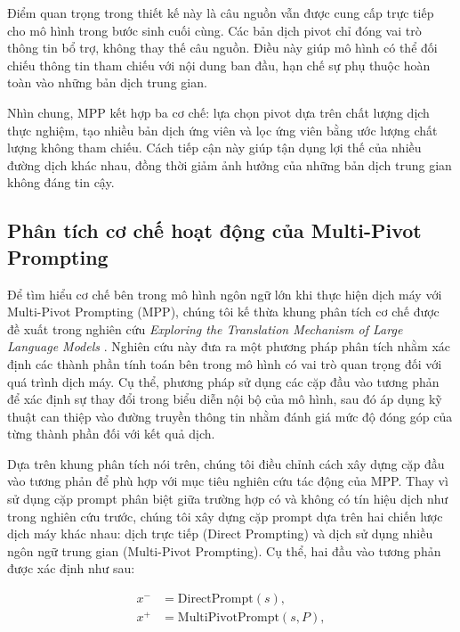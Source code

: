 Điểm quan trọng trong thiết kế này là câu nguồn vẫn được cung cấp trực tiếp cho mô hình trong bước sinh cuối cùng. Các bản dịch pivot chỉ đóng vai trò thông tin bổ trợ, không thay thế câu nguồn. Điều này giúp mô hình có thể đối chiếu thông tin tham chiếu với nội dung ban đầu, hạn chế sự phụ thuộc hoàn toàn vào những bản dịch trung gian.

Nhìn chung, MPP kết hợp ba cơ chế: lựa chọn pivot dựa trên chất lượng dịch thực nghiệm, tạo nhiều bản dịch ứng viên và lọc ứng viên bằng ước lượng chất lượng không tham chiếu. Cách tiếp cận này giúp tận dụng lợi thế của nhiều đường dịch khác nhau, đồng thời giảm ảnh hưởng của những bản dịch trung gian không đáng tin cậy.


\subsection{Phân tích cơ chế hoạt động của Multi-Pivot Prompting}

Để tìm hiểu cơ chế bên trong mô hình ngôn ngữ lớn khi thực hiện dịch máy với Multi-Pivot Prompting (MPP), chúng tôi kế thừa khung phân tích cơ chế được đề xuất trong nghiên cứu \textit{Exploring the Translation Mechanism of Large Language Models} \cite{zhang2026exploring}. Nghiên cứu này đưa ra một phương pháp phân tích nhằm xác định các thành phần tính toán bên trong mô hình có vai trò quan trọng đối với quá trình dịch máy. Cụ thể, phương pháp sử dụng các cặp đầu vào tương phản để xác định sự thay đổi trong biểu diễn nội bộ của mô hình, sau đó áp dụng kỹ thuật can thiệp vào đường truyền thông tin nhằm đánh giá mức độ đóng góp của từng thành phần đối với kết quả dịch.

Dựa trên khung phân tích nói trên, chúng tôi điều chỉnh cách xây dựng cặp đầu vào tương phản để phù hợp với mục tiêu nghiên cứu tác động của MPP. Thay vì sử dụng cặp prompt phân biệt giữa trường hợp có và không có tín hiệu dịch như trong nghiên cứu trước, chúng tôi xây dựng cặp prompt dựa trên hai chiến lược dịch máy khác nhau: dịch trực tiếp (Direct Prompting) và dịch sử dụng nhiều ngôn ngữ trung gian (Multi-Pivot Prompting). Cụ thể, hai đầu vào tương phản được xác định như sau:

\begin{equation}
	\begin{aligned}
		x^- &= \mathrm{DirectPrompt}(s), \\
		x^+ &= \mathrm{MultiPivotPrompt}(s, P),
	\end{aligned}
\end{equation}

